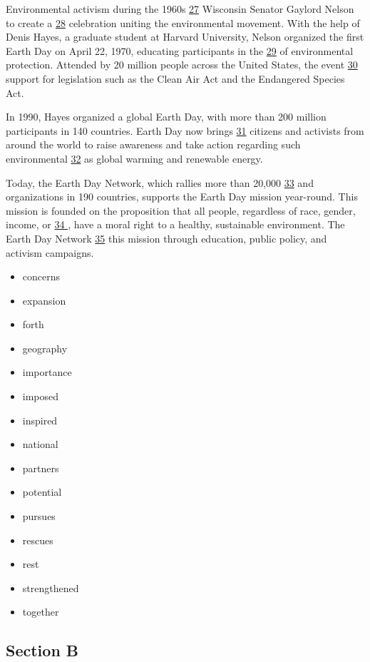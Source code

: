 \documentclass[UTF8,11pt]{ctexart}
\begin{document}
Environmental activism during the 1960s \uline{27} Wisconsin Senator Gaylord Nelson to create a \uline{28} celebration uniting the environmental movement. With the help of Denis Hayes, a graduate student at Harvard University, Nelson organized the first Earth Day on April 22, 1970, educating participants in the \uline{29} of environmental protection. Attended by 20 million people across the United States, the event \uline{30} support for legislation such as the Clean Air Act and the Endangered Species Act.


In 1990, Hayes organized a global Earth Day, with more than 200 million participants in 140 countries. Earth Day now brings \uline{31} citizens and activists from around the world to raise awareness and take action regarding such environmental \uline{32} as global warming and renewable energy.


Today, the Earth Day Network, which rallies more than 20,000 \uline{33} and organizations in 190 countries, supports the Earth Day mission year-round. This mission is founded on the proposition that all people, regardless of race, gender, income, or \uline{34 }, have a moral right to a healthy, sustainable environment. The Earth Day Network \uline{35} this mission through education, public policy, and activism campaigns.


\begin{itemize}[leftmargin=2em,itemsep=.2em,topsep=.4em]\item[A.] concerns
\item[B.] expansion
\item[C.] forth
\item[D.] geography
\item[E.] importance
\item[F.] imposed
\item[G.] inspired
\item[H.] national
\item[I.] partners
\item[J.] potential
\item[K.] pursues
\item[L.] rescues
\item[M.] rest
\item[N.] strengthened
\item[O.] together
\end{itemize}

\subsection*{\textbf{Section B}}
\end{document}
